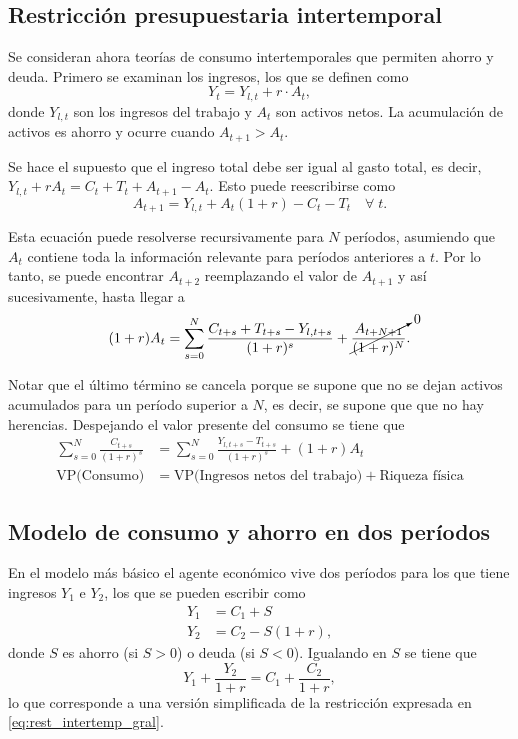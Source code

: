 \documentclass[DeGregorioResumen]{subfiles}
\begin{document}
\subsection{Restricción presupuestaria intertemporal}

Se consideran ahora teorías de consumo intertemporales que permiten ahorro y deuda. Primero se examinan los ingresos, los que se definen como
\begin{equation}
Y_t=Y_{l,t}+r\cdot A_t,
\end{equation}
donde $Y_{l,t}$ son los ingresos del trabajo y $A_t$ son activos netos. La acumulación de activos es ahorro y ocurre cuando $A_{t+1}>A_t$.

Se hace el supuesto que el ingreso total debe ser igual al gasto total, es decir, $Y_{l,t}+rA_t=C_t+T_t+A_{t+1}-A_t$. Esto puede reescribirse como
\begin{equation*}
A_{t+1}=Y_{l,t}+A_t(1+r)-C_t-T_t \quad \forall \; t.
\end{equation*}

Esta ecuación puede resolverse recursivamente para $N$ períodos, asumiendo que $A_t$ contiene toda la información relevante para períodos anteriores a $t$. Por lo tanto, se puede encontrar $A_{t+2}$ reemplazando el valor de $A_{t+1}$ y así sucesivamente, hasta llegar a
\begin{equation*}
(1+r)A_t=\sum_{s=0}^N\frac{C_{t+s}+T_{t+s}-Y_{l,t+s}}{(1+r)^s}+\cancelto{0}{\frac{A_{t+N+1}}{(1+r)^N}}.
\end{equation*}

Notar que el último término se cancela porque se supone que no se dejan activos acumulados para un período superior a $N$, es decir, se supone que que no hay herencias. Despejando el valor presente del consumo se tiene que
\begin{align}
\sum_{s=0}^N\frac{C_{t+s}}{(1+r)^s}&=\sum_{s=0}^N\frac{Y_{l,t+s}-T_{t+s}}{(1+r)^s}+(1+r)A_t \label{eq:rest_intertemp_gral} \\
\text{VP(Consumo)}&=\text{VP(Ingresos netos del trabajo)}+\text{Riqueza física} \nonumber 
\end{align}

\subsection{Modelo de consumo y ahorro en dos períodos}

En el modelo más básico el agente económico vive dos períodos para los que tiene ingresos $Y_1$ e $Y_2$, los que se pueden escribir como
\begin{align*}
Y_1 &= C_1+S \\
Y_2 &= C_2-S(1+r),
\end{align*}
donde $S$ es ahorro (si $S>0$) o deuda (si $S<0$). Igualando en $S$ se tiene que
\begin{equation}
Y_1+\frac{Y_2}{1+r}=C_1+\frac{C_2}{1+r},
\end{equation}
lo que corresponde a una versión simplificada de la restricción expresada en \eqref{eq:rest_intertemp_gral}.
\end{document}
